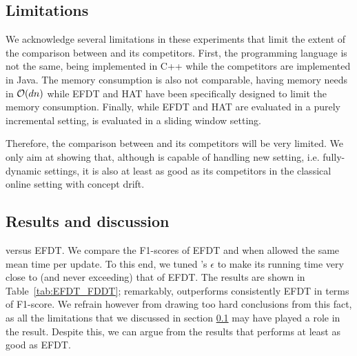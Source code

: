 \subsection{Limitations}\label{subsec:fudy_limitations}
We acknowledge several limitations in these experiments that limit the extent of the comparison between \algo{} and its competitors. First, the programming language is not the same, \algo{} being implemented in C++ while the competitors are implemented in Java. The memory consumption is also not comparable, \algo{} having memory needs in $\mathcal{O}(dn)$ while EFDT and HAT have been specifically designed to limit the memory consumption. Finally, while EFDT and HAT are evaluated in a purely incremental setting, \algo{} is evaluated in a sliding window setting.

Therefore, the comparison between \algo{} and its competitors will be very limited. We only aim at showing that, although \algo{} is capable of handling new setting, i.e. fully-dynamic settings, it is also at least as good as its competitors in the classical online setting with concept drift.

\subsection{Results and discussion}

\begin{paragraph}{\algo{} versus EFDT.} We compare the F1-scores of EFDT and \algo{} when allowed the same mean time per update. To this end, we tuned \algo{}'s $\epsilon$ to make its running time very close to (and never exceeding) that of EFDT. The results are shown in Table~\ref{tab:EFDT_FDDT}; remarkably, \algo{} outperforms consistently EFDT in terms of F1-score. We refrain however from drawing too hard conclusions from this fact, as all the limitations that we discussed in section \ref{subsec:fudy_limitations} may have played a role in the result. Despite this, we can argue from the results that \algo{} performs at least as good as EFDT.
\end{paragraph} 

